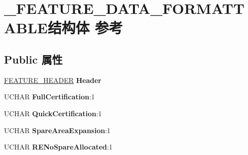 \hypertarget{struct___f_e_a_t_u_r_e___d_a_t_a___f_o_r_m_a_t_t_a_b_l_e}{}\section{\+\_\+\+F\+E\+A\+T\+U\+R\+E\+\_\+\+D\+A\+T\+A\+\_\+\+F\+O\+R\+M\+A\+T\+T\+A\+B\+L\+E结构体 参考}
\label{struct___f_e_a_t_u_r_e___d_a_t_a___f_o_r_m_a_t_t_a_b_l_e}
\subsection*{Public 属性}
\begin{DoxyCompactItemize}
\item 
\mbox{\label{struct___f_e_a_t_u_r_e___d_a_t_a___f_o_r_m_a_t_t_a_b_l_e_a1d35b8aa899b66944da6d8d2b311c263}} 
\hyperlink{struct___f_e_a_t_u_r_e___h_e_a_d_e_r}{F\+E\+A\+T\+U\+R\+E\+\_\+\+H\+E\+A\+D\+ER} {\bfseries Header}
\item 
\mbox{\label{struct___f_e_a_t_u_r_e___d_a_t_a___f_o_r_m_a_t_t_a_b_l_e_a1c912572674d791648d5a450280a729f}} 
U\+C\+H\+AR {\bfseries Full\+Certification}\+:1
\item 
\mbox{\label{struct___f_e_a_t_u_r_e___d_a_t_a___f_o_r_m_a_t_t_a_b_l_e_a5e050fcba03fde122989cb6978f7ab3b}} 
U\+C\+H\+AR {\bfseries Quick\+Certification}\+:1
\item 
\mbox{\label{struct___f_e_a_t_u_r_e___d_a_t_a___f_o_r_m_a_t_t_a_b_l_e_ae2fedc6debf96b059a9d8b7be6657f23}} 
U\+C\+H\+AR {\bfseries Spare\+Area\+Expansion}\+:1
\item 
\mbox{\label{struct___f_e_a_t_u_r_e___d_a_t_a___f_o_r_m_a_t_t_a_b_l_e_a221453ce97b97407a38d51bf8014a560}} 
U\+C\+H\+AR {\bfseries R\+E\+No\+Spare\+Allocated}\+:1
\item 
\mbox{\label{struct___f_e_a_t_u_r_e___d_a_t_a___f_o_r_m_a_t_t_a_b_l_e_a5afca60182b17d1e85cde3e1769bc046}} 

\end{DoxyCompactItemize}
